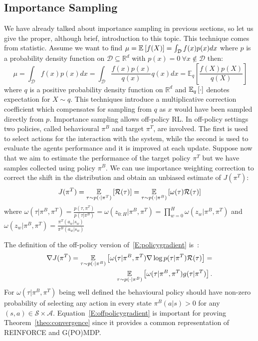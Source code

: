 \subsection{Importance Sampling}\label{subsec:is}
We have already talked about importance sampling in previous sections, so let us give the proper, although brief, introduction to this topic.\newline
This technique comes from statistic. Assume we want to find $\mu=\EVV[]{f(X)}=\int_{\mathcal{D}}f(x)p(x)dx$ where $p$ is a probability density function on $\mathcal{D}\subseteq \mathbb{R}^d$ with $p(x)=0 ~\forall x \notin \mathcal{D}$ then:
\[
\ \mu=\int_{\mathcal{D}}f(x)p(x)dx=\int_{\mathcal{D}}\frac{f(x)p(x)}{q(x)}q(x)dx=\mathbb{E}_q\left[\frac{f(X)p(X)}{q(X)}\right]
\]
where $q$ is a positive probability density function on $\mathbb{R}^d$ and $\EVV[q]{\cdot}$ denotes expectation for $X \sim q$. This techniques introduce a multiplicative correction coefficient which compensates for sampling from $q$ as $x$ would have been sampled directly from $p$. Importance sampling allows off-policy \acs{RL}. In off-policy settings two policies, called behavioural $\pi^B$ and target $\pi^T$, are involved.
The first is used to select actions for the interaction with the system, while the second is used to evaluate the agent\textquotesingle s performance and it is improved at each update.
Suppose now that we aim to estimate the performance of the target policy $\pi^T$ but we have samples collected using policy $\pi^B$.
We can use importance weighting correction to correct the shift in the distribution and obtain an unbiased estimate of $J(\pi^T)$:
\[
J(\pi^T) = \EVV[\tau \sim p(\cdot|\pi^T)]{\mathcal{R}(\tau)} = \EVV[\tau \sim p(\cdot|\pi^B)]{\omega(\tau) \mathcal{R}(\tau)}
\]
where $\omega(\tau|\pi^B,\pi^T) = \frac{p(\tau,\pi^T)}{p(\tau|\pi^B)} = \omega(z_{0:H}|\pi^B,\pi^T) = \prod_{w=0}^{H} \omega(z_w|\pi^B,\pi^T)$ and $\omega(z_w|\pi^B,\pi^T) = \frac{\pi^T(a_w|s_w)}{\pi^B(a_w|s_w)}$\newline

The definition of the off-policy version of~\eqref{E:policygradient} is~\citep[\eg][]{jurvcivcek2012reinforcement}:
\begin{eqnarray}\label{E:offpolicygradient}
\nonumber \nabla J(\pi^T) = \EVV[\tau \sim p(\cdot|\pi^B)]{\omega(\tau|\pi^B,\pi^T) \nabla \log p(\tau|\pi^T) \mathcal{R}(\tau)} =\\ \EVV[\tau \sim p(\cdot|\pi^B)]{\omega(\tau|\pi^B,\pi^T) g(\tau|\pi^T)}. 
\end{eqnarray}
For $\omega(\tau|\pi^B,\pi^T)$ being well defined the behavioural policy should have non-zero probability of selecting any action in every state \ie $\pi^B(a|s) > 0$ for any $(s,a)\in \mathcal{S} \times \mathcal{A}$.
Equation~\ref{E:offpolicygradient} is important for proving Theorem~\ref{theo:convergence} since it provides a common representation of REINFORCE and G(PO)MDP.

